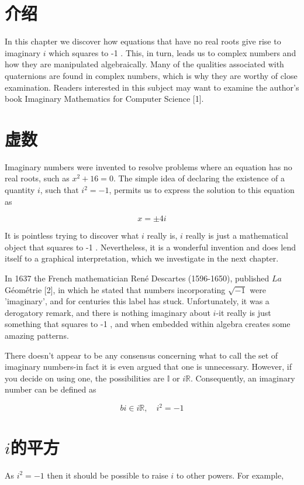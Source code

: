 
\section{介绍}
In this chapter we discover how equations that have no real roots give rise to imaginary $i$ which squares to -1 . This, in turn, leads us to complex numbers and how they are manipulated algebraically. Many of the qualities associated with quaternions are found in complex numbers, which is why they are worthy of close examination. Readers interested in this subject may want to examine the author's book Imaginary Mathematics for Computer Science [1].

\section{虚数}
Imaginary numbers were invented to resolve problems where an equation has no real roots, such as $x^{2}+16=0$. The simple idea of declaring the existence of a quantity $i$, such that $i^{2}=-1$, permits us to express the solution to this equation as

$$
x= \pm 4 i
$$

It is pointless trying to discover what $i$ really is, $i$ really is just a mathematical object that squares to -1 . Nevertheless, it is a wonderful invention and does lend itself to a graphical interpretation, which we investigate in the next chapter.

In 1637 the French mathematician René Descartes (1596-1650), published $L a$ Géométrie [2], in which he stated that numbers incorporating $\sqrt{-1}$ were 'imaginary', and for centuries this label has stuck. Unfortunately, it was a derogatory remark, and there is nothing imaginary about $i$-it really is just something that squares to -1 , and when embedded within algebra creates some amazing patterns.

There doesn't appear to be any consensus concerning what to call the set of imaginary numbers-in fact it is even argued that one is unnecessary. However, if you decide on using one, the possibilities are $\mathbb{I}$ or $i \mathbb{R}$. Consequently, an imaginary number can be defined as

$$
b i \in i \mathbb{R}, \quad i^{2}=-1
$$

\section{\boldmath$i$的平方}
As $i^{2}=-1$ then it should be possible to raise $i$ to other powers. For example,

